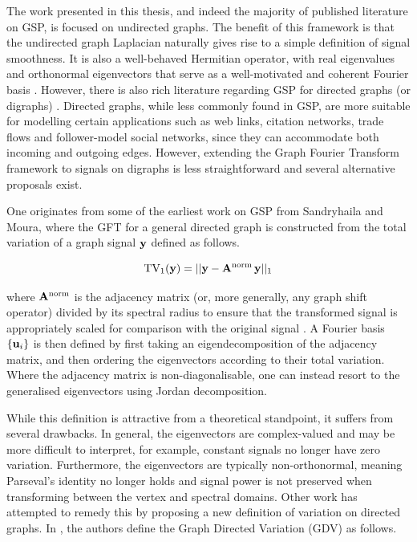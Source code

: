 The work presented in this thesis, and indeed the majority of published literature on GSP, is focused on undirected graphs. The benefit of this framework is that the undirected graph Laplacian naturally gives rise to a simple definition of signal smoothness. It is also a well-behaved Hermitian operator, with real eigenvalues and orthonormal eigenvectors that serve as a well-motivated and coherent Fourier basis \citep{Ortega2018}. However, there is also rich literature regarding GSP for directed graphs (or digraphs) \citep{Marques2020}. Directed graphs, while less commonly found in GSP, are more suitable for modelling certain applications such as web links, citation networks, trade flows and follower-model social networks, since they can accommodate both incoming and outgoing edges. However, extending the Graph Fourier Transform framework to signals on digraphs is less straightforward and several alternative proposals exist. 

One originates from some of the earliest work on GSP from Sandryhaila and Moura, where the GFT for a general directed graph is constructed from the total variation of a graph signal $\mathbf{y}$ defined as follows. 

\begin{equation}
    \text{TV}_1(\mathbf{y}) = || \mathbf{y} - \mathbf{A}^{\text{norm}} \, \mathbf{y} ||_1
\end{equation}

where $\mathbf{A}^{\text{norm}}$ is the adjacency matrix (or, more generally, any graph shift operator) divided by its spectral radius to ensure that the transformed signal is appropriately scaled for comparison with the original signal \citep{Sandryhaila2013b}. A Fourier basis $\{\mathbf{u}_i \}$ is then defined by first taking an eigendecomposition of the adjacency matrix, and then ordering the eigenvectors according to their total variation. Where the adjacency matrix is non-diagonalisable, one can instead resort to the generalised eigenvectors using Jordan decomposition. 

While this definition is attractive from a theoretical standpoint, it suffers from several drawbacks. In general, the eigenvectors are complex-valued and may be more difficult to interpret, for example, constant signals no longer have zero variation. Furthermore, the eigenvectors are typically non-orthonormal, meaning Parseval's identity no longer holds and signal power is not preserved when transforming between the vertex and spectral domains. Other work has attempted to remedy this by proposing a new definition of variation on directed graphs. In \cite{Sardellitti2017}, the authors define the Graph Directed Variation (GDV) as follows. 


